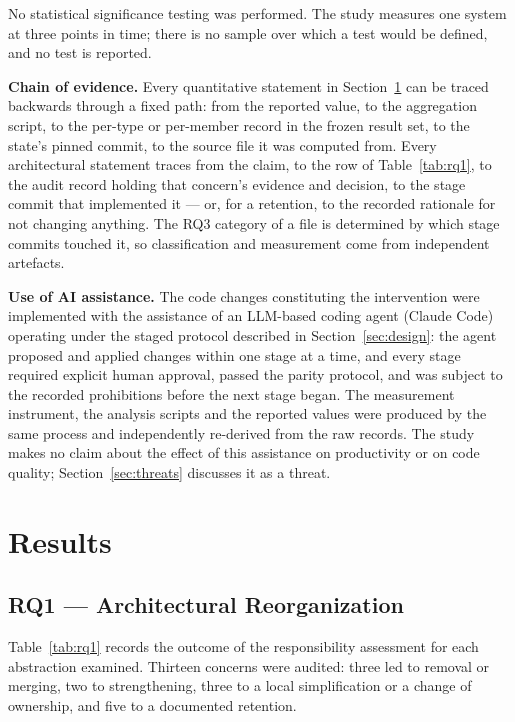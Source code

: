 \documentclass{sbc2019}%
\begin{document}
No statistical significance testing was performed. The study measures one
system at three points in time; there is no sample over which a test would be
defined, and no test is reported.

\medskip\noindent\textbf{Chain of evidence.} Every quantitative statement in
Section~\ref{sec:results} can be traced backwards through a fixed path: from the
reported value, to the aggregation script, to the per-type or per-member record
in the frozen result set, to the state's pinned commit, to the source file it was
computed from. Every architectural statement traces from the claim, to the row of
Table~\ref{tab:rq1}, to the audit record holding that concern's evidence and
decision, to the stage commit that implemented it --- or, for a retention, to the
recorded rationale for not changing anything. The RQ3 category of a file is
determined by which stage commits touched it, so classification and measurement
come from independent artefacts.

\medskip\noindent\textbf{Use of AI assistance.} The code changes constituting
the intervention were implemented with the assistance of an LLM-based coding
agent (Claude Code) operating under the staged protocol described in
Section~\ref{sec:design}: the agent proposed and applied changes within one stage
at a time, and every stage required explicit human approval, passed the parity
protocol, and was subject to the recorded prohibitions before the next stage
began. The measurement instrument, the analysis scripts and the reported values
were produced by the same process and independently re-derived from the raw
records. The study makes no claim about the effect of this assistance on
productivity or on code quality; Section~\ref{sec:threats} discusses it as a
threat.


\section{Results}\label{sec:results}

\subsection{RQ1 --- Architectural Reorganization}\label{sec:rq1}

Table~\ref{tab:rq1} records the outcome of the responsibility assessment for
each abstraction examined. Thirteen concerns were audited: three led to removal or
merging, two to strengthening, three to a local simplification or a change
of ownership, and five to a documented retention.
\end{document}
